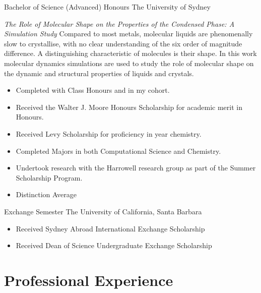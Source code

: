 {Bachelor of Science (Advanced) Honours}
{The University of Sydney}{}{}
{%
  \emph{The Role of Molecular Shape on the Properties of the Condensed Phase: A Simulation Study}
  Compared to most metals, molecular liquids are phenomenally slow to crystallise,
  with no clear understanding of the six order of magnitude difference.
  A distinguishing characteristic of molecules is their shape.
  In this work molecular dynamics simulations are used to study
  the role of molecular shape on the dynamic and
  structural properties of liquids and crystals.
  \begin{itemize}
    \item Completed with  Class Honours and  in my cohort.
    \item Received the Walter J. Moore Honours Scholarship for academic merit in Honours.
    \item Received Levy Scholarship for proficiency in  year chemistry.
    \item Completed Majors in both Computational Science and Chemistry.
    \item Undertook research with the Harrowell research group as part of the Summer Scholarship Program.
    \item Distinction Average
  \end{itemize}
}
\vspace{1em}

{Exchange Semester}
{The University of California, Santa Barbara}{}{}
{%
\begin{itemize}
  \item Received Sydney Abroad International Exchange Scholarship
  \item Received Dean of Science Undergraduate Exchange Scholarship
\end{itemize}
}

\nocite{*}
\printbibliography[title={Selected Publications}]

\pagebreak
\section{Professional Experience}


